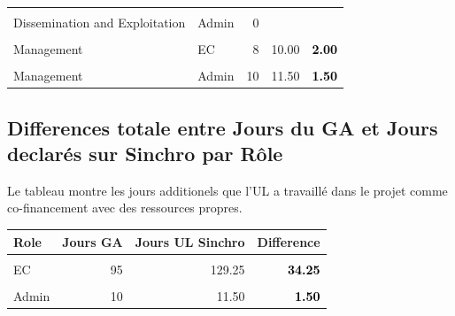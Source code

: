 \documentclass[
  a4paperpaper,
  onecolumn]{article}
\begin{document}
\begin{table}[H]
\begin{tabular}[t]{llrr|>{}r}
\cmidrule{1-5}
\cellcolor{gray!6}{Dissemination and Exploitation} & \cellcolor{gray!6}{Tech} & \cellcolor{gray!6}{2} & \cellcolor{gray!6}{3.00} & \textcolor{black}{\textbf{\cellcolor{gray!6}{1.00}}}\\
\cmidrule{1-5}
Dissemination and Exploitation & Admin & 0 &  & \textcolor{black}{\textbf{}}\\
\cmidrule{1-5}
\cellcolor{gray!6}{Management} & \cellcolor{gray!6}{Man} & \cellcolor{gray!6}{2} & \cellcolor{gray!6}{3.00} & \textcolor{black}{\textbf{\cellcolor{gray!6}{1.00}}}\\
\cmidrule{1-5}
Management & EC & 8 & 10.00 & \textcolor{black}{\textbf{2.00}}\\
\cmidrule{1-5}
\cellcolor{gray!6}{Management} & \cellcolor{gray!6}{Tech} & \cellcolor{gray!6}{10} & \cellcolor{gray!6}{14.25} & \textcolor{black}{\textbf{\cellcolor{gray!6}{4.25}}}\\
\cmidrule{1-5}
Management & Admin & 10 & 11.50 & \textcolor{black}{\textbf{1.50}}\\
\bottomrule
\end{tabular}
\end{table}

\hypertarget{differences-totale-entre-jours-du-ga-et-jours-declaruxe9s-sur-sinchro-par-ruxf4le}{%
\subsection{Differences totale entre Jours du GA et Jours declarés sur
Sinchro par
Rôle}\label{differences-totale-entre-jours-du-ga-et-jours-declaruxe9s-sur-sinchro-par-ruxf4le}}

Le tableau montre les jours additionels que l'UL a travaillé dans le
projet comme co-financement avec des ressources propres.

\begin{table}[H]
\centering\begingroup\fontsize{10}{12}\selectfont

\begin{tabular}[t]{lrr|>{}r}
\toprule
Role & Jours GA & Jours UL Sinchro & Difference\\
\midrule
\cellcolor{gray!6}{Man} & \cellcolor{gray!6}{11} & \cellcolor{gray!6}{17.00} & \textcolor{black}{\textbf{\cellcolor{gray!6}{6.00}}}\\
EC & 95 & 129.25 & \textcolor{black}{\textbf{34.25}}\\
\cellcolor{gray!6}{Tech} & \cellcolor{gray!6}{56} & \cellcolor{gray!6}{62.75} & \textcolor{black}{\textbf{\cellcolor{gray!6}{6.75}}}\\
Admin & 10 & 11.50 & \textcolor{black}{\textbf{1.50}}\\
\bottomrule
\end{tabular}
\endgroup{}
\end{table}
\end{document}
